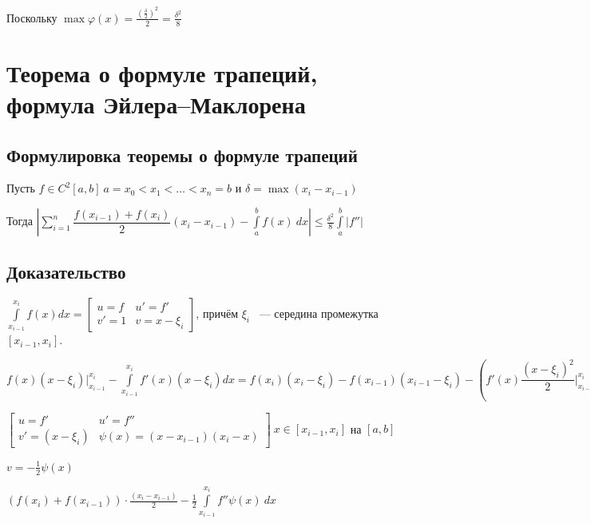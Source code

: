 \documentclass{article}
\begin{document}
			Поскольку $\max \varphi(x) = \frac{(\frac{\delta}{2})^2}{2} = \frac{\delta^2}{8}$

	\newpage

	\section{Теорема о формуле трапеций, формула Эйлера--Маклорена}

		\subsection{Формулировка теоремы о формуле трапеций}

			Пусть $f \in C^2[a, b] \ a = x_0 < x_1 < \ldots < x_n = b$ и $\delta = \max (x_i - x_{i - 1})$

			Тогда $\left| \sum\limits^n_{i = 1} \dfrac{f(x_{i - 1}) + f(x_i)}{2} (x_i - x_{i - 1}) - \int\limits^b_a f(x) \ dx \right| \leq \frac{\delta^2}{8} \int\limits^b_a |f''|$

		\subsection{Доказательство}

			$\int\limits^{x_i}_{x_{i - 1}} f(x) dx = \begin{bmatrix} u = f & u' = f' \\ v' = 1 & v = x - \xi_i \end{bmatrix}$, причём $\xi_i$ ~--- середина промежутка $[x_{i - 1}, x_i]$. 
			
			$f(x)(x - \xi_i) \bigg|^{x_i}_{x_{i - 1}} - \int\limits^{x_i}_{x_{i - 1}} f'(x)(x - \xi_i) dx = f(x_i) (x_i - \xi_i) - f(x_{i - 1})(x_{i - 1} - \xi_i) - \left(f'(x) \dfrac{(x - \xi_i)^2}{2} \bigg|^{x_i}_{x_{i - 1}} - \int\limits^{x_i}_{x_{i - 1}} f'' \dfrac{(x - \xi_i)^2}{2}  dx \right) = \left(f(x_i) + f(x_{i - 1}) \right) \dfrac{x_i - x_{i - 1}}{2} - \left( f'(x) \left( - \dfrac{1}{2} \psi(x) \right) \bigg|^{x_i}_{x_{i - 1}} - \int\limits^{x_i}_{x_{i - 1}} f'' \left(-\frac{1}{2} \psi(x) \right) \ dx \right)$

			$\begin{bmatrix} u = f' & u' = f'' \\ v' = (x - \xi_i) & \psi(x) = (x - x_{i - 1})(x_i - x) \end{bmatrix} \ x \in [x_{i - 1}, x_i]$ на $[a, b]$

			$v = -\frac{1}{2} \psi(x)$

			$(f(x_i) + f(x_{i - 1})) \cdot \frac{(x_i - x_{i - 1})}{2} - \frac{1}{2} \int\limits^{x_i}_{x_{i - 1}} f'' \psi(x) \ dx$
\end{document}
